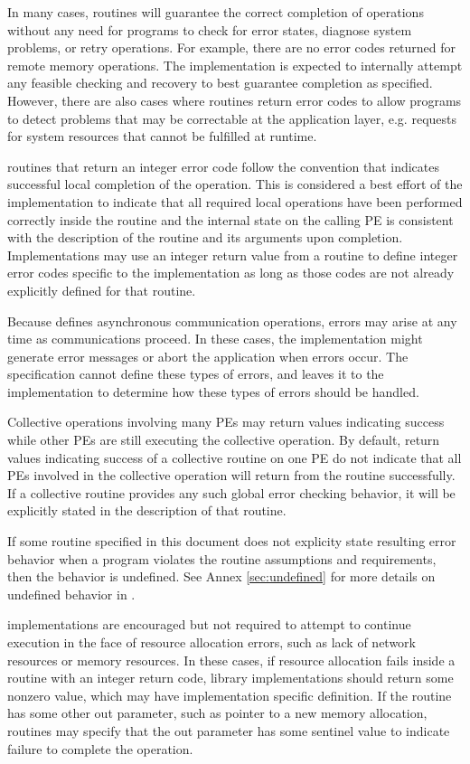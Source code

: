 In many cases, \openshmem routines will guarantee the correct completion of operations without any need for programs to check for error states, diagnose system problems, or retry operations. For example, there are no error codes returned for remote memory operations. The implementation is expected to internally attempt any feasible checking and recovery to best guarantee completion as specified. However, there are also cases where routines return error codes to allow programs to detect problems that may be correctable at the application layer, e.g. requests for system resources that cannot be fulfilled at runtime.

\CorCpp routines that return an integer error code follow the convention that  indicates successful local completion of the operation. This is considered a best effort of the implementation to indicate that all required local operations have been performed correctly inside the routine and the internal \openshmem state on the calling \ac{PE} is consistent with the description of the routine and its arguments upon completion. Implementations may use an integer return value from a routine to define integer error codes specific to the implementation as long as those codes are not already explicitly defined for that routine.

Because \openshmem defines asynchronous communication operations, errors may arise at any time as communications proceed. In these cases, the implementation might generate error messages or abort the application when errors occur. The \openshmem specification cannot define these types of errors, and leaves it to the implementation to determine how these types of errors should be handled.

Collective operations involving many \acp{PE} may return values indicating success while other \acp{PE} are still executing the collective operation. By default, return values indicating success of a collective routine on one \ac{PE} do not indicate that all \acp{PE} involved in the collective operation will return from the routine successfully. If a collective routine provides any such global error checking behavior, it will be explicitly stated in the description of that routine.

If some routine specified in this document does not explicity state resulting error behavior when a program violates the routine assumptions and requirements, then the behavior is undefined. See Annex \ref{sec:undefined} for more details on undefined behavior in \openshmem.

\openshmem implementations are encouraged but not required to attempt to continue execution in the face of resource allocation errors, such as lack of network resources or memory resources. In these cases, if resource allocation fails inside a routine with an integer return code, library implementations should return some nonzero value, which may have implementation specific definition. If the routine has some other out parameter, such as pointer to a new memory allocation, routines may specify that the out parameter has some sentinel value to indicate failure to complete the operation.


